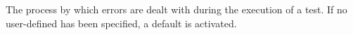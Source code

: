 \item[Event Handling]{
The process by which errors are dealt with during
the execution of a test. If no user-defined \gdehandler{}
has been specified, 
a default \gdehandler{} is activated. 
}
